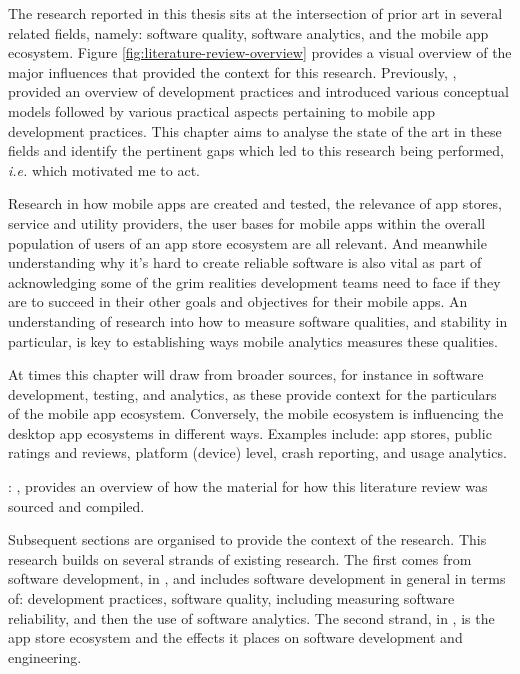 The research reported in this thesis sits at the intersection of prior art in several related fields, namely: software quality, software analytics, and the mobile app ecosystem. Figure \ref{fig:literature-review-overview} provides a visual overview of the major influences that provided the context for this research. %
Previously, , provided an overview of development practices and introduced various conceptual models followed by various practical aspects pertaining to mobile app development practices.  
This chapter aims to analyse the state of the art in these fields and identify the pertinent gaps which led to this research being performed, \emph{i.e.} which motivated me to act.  

Research in how mobile apps are created and tested, the relevance of app stores, service and utility providers, the user bases for mobile apps within the overall population of users of an app store ecosystem are all relevant. And meanwhile understanding why it's hard to create reliable software is also vital as part of acknowledging some of the grim realities development teams need to face if they are to succeed in their other goals and objectives for their mobile apps. An understanding of research into how to measure software qualities, and stability in particular, is key to establishing ways mobile analytics measures these qualities. 

At times this chapter will draw from broader sources, for instance in software development, testing, and analytics, as these provide context for the particulars of the mobile app ecosystem. Conversely, the mobile ecosystem is influencing the desktop app ecosystems in different ways.  
Examples include: app stores, %
public ratings and reviews, platform (device) level, crash reporting, and usage analytics.

: 
{}, provides an overview of how the material for how this literature review was sourced and compiled.

Subsequent sections are organised to provide the context of the research. This research builds on several strands of existing research. The first comes from software development, in , and includes software development in general in terms of: development practices, software quality, including measuring software reliability, and then the use of software analytics. The second strand, in , is the app store ecosystem and the effects it places on software development and engineering.

